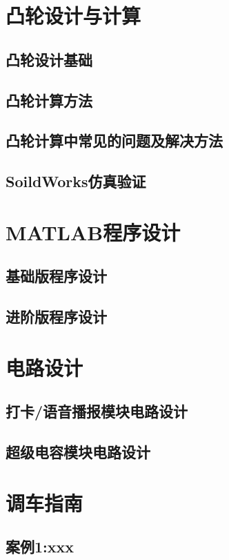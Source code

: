 \documentclass[lang=cn,newtx,14pt,scheme=chinese]{elegantbook}
\begin{document}
\section{凸轮设计与计算}
\subsection{凸轮设计基础}
\subsection{凸轮计算方法}
\subsection{凸轮计算中常见的问题及解决方法}
\subsection{SoildWorks仿真验证}


\section{MATLAB程序设计}
\subsection{基础版程序设计}
\subsection{进阶版程序设计}





\section{电路设计}
\subsection{打卡/语音播报模块电路设计}
\subsection{超级电容模块电路设计}




\section{调车指南}
\subsection{案例1:xxx}
\end{document}
